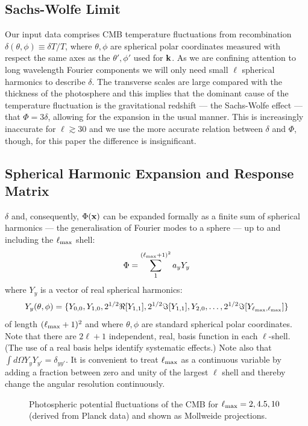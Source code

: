 \documentclass[useAMS,usenatbib,a4paper]{mn2e}
\begin{document}
\subsection{Sachs-Wolfe Limit}
Our input data comprises CMB temperature fluctuations from recombination $\delta(\theta,\phi)\equiv\delta T/T$, where $\theta,\phi$ are spherical polar coordinates measured with respect the same axes as the $\theta',\phi'$ used for $\bf k$. As we are confining attention to long wavelength Fourier components we will only need small $\ell$ spherical harmonics to describe $\delta$. The transverse scales are large compared with the thickness of the photosphere and this implies that the dominant cause of the temperature fluctuation is the gravitational redshift --- the Sachs-Wolfe effect --- that $\Phi=3\delta$, allowing for the expansion in the usual manner. This is increasingly inaccurate for $\ell\gtrsim30$ and we use the more accurate relation between $\delta$ and $\Phi$, though, for this paper the difference is insignificant.
\subsection{Spherical Harmonic Expansion and Response Matrix}
$\delta$ and, consequently, $\Phi({\bf x})$ can be expanded formally as a finite sum of spherical harmonics --- the generalisation of Fourier modes to a sphere --- up to and including the $\ell_{\rm max}$ shell:
\begin{equation}
\Phi=\sum_1^{(\ell_{\rm max}+1)^2}a_yY_y
\end{equation}
where $Y_y$ is a vector of real spherical harmonics:
\begin{equation} 
Y_y(\theta,\phi)=\{Y_{0,0},Y_{1,0},2^{1/2}\Re[Y_{1,1}],2^{1/2}\Im[Y_{1,1}],Y_{2,0},\dots,2^{1/2}\Im[Y_{\ell_{\rm max},\ell_{\rm max}}]\}
\end{equation}
of length $(\ell_{\rm max}+1)^2$ and where $\theta,\phi$ are standard spherical polar coordinates. Note that there are $2\ell+1$ independent, real, basis function in each $\ell$-shell. (The use of a real basis helps identify systematic effects.) Note also that $\int d\Omega Y_yY_{y'}=\delta_{yy'}$. It is convenient to treat $\ell_{\rm max}$ as a continuous variable by adding a fraction between zero and unity of the largest $\ell$ shell and thereby change the angular resolution continuously. 
\begin{figure}[t]
\centering
\caption{{\small Photospheric potential fluctuations of the CMB for $\ell_{\rm max}=2,4.5,10$ (derived from Planck data) and shown as Mollweide projections.}}
\end{figure}
\end{document}
